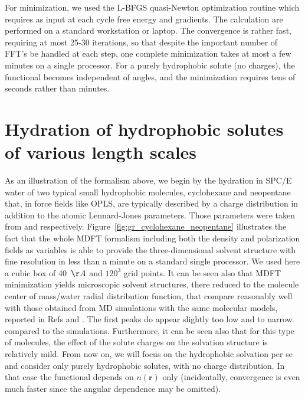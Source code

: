 \documentclass[aip,jcp,preprint]{revtex4-1}
\newcommand{\rr}{\mathbf{r}}
\begin{document}
For minimization, we used the L-BFGS quasi-Newton optimization routine\cite{BFGS} which requires as input at each cycle free energy and gradients.  The calculation are performed on  a standard  workstation or laptop. The convergence is rather fast, requiring at most 25-30 iterations, so that despite the important number of FFT's be handled at each step, one complete minimization takes at most a few minutes on a single processor.  For a purely hydrophobic solute (no charges), the functional becomes independent of angles,  and the minimization requires tens of seconds rather than minutes. 




\section{Hydration of hydrophobic solutes of various length scales}

As an illustration of the formalism above, we begin by the hydration in SPC/E water of two typical small hydrophobic molecules, cyclohexane and neopentane that, in force fields like OPLS, are typically described by a charge distribution in addition to the atomic Lennard-Jones parameters. Those parameters were taken from \cite{raschke_2004} and \cite{Huang_2003} respectively. Figure~\ref{fig:gr_cyclohexane_neopentane} illustrates the fact that the whole MDFT formalism including both the density and polarization fields as variables is able to provide the three-dimensional solvent structure with fine resolution in less than a minute on a standard single processor. We used here a cubic box of 40~$\AA$ and $120^3$ grid points. It can be seen also that MDFT minimization yields  microscopic solvent structures, there reduced to the molecule center of mass/water radial distribution function, that compare reasonably well with those obtained from MD simulations with the same molecular models, reported in  Refs\cite{raschke_2004} and \cite{Huang_2003}. The first peaks do appear slightly too low and to narrow compared to the simulations. Furthermore, it can be seen also that for this type of molecules, the effect of the solute charges on the solvation structure is relatively mild. From now on, we will focus on the hydrophobic solvation per se and consider only purely hydrophobic solutes, with no charge distribution. In that case the functional depends on $n(\rr)$ only (incidentally, convergence is even much faster since the angular dependence may be omitted).   
\end{document}
